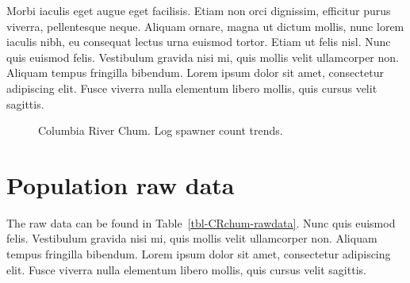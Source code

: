 \documentclass[
  letterpaper,
  oneside,
  open=any]{scrbook}
\begin{document}
Morbi iaculis eget augue eget facilisis. Etiam non orci dignissim,
efficitur purus viverra, pellentesque neque. Aliquam ornare, magna ut
dictum mollis, nunc lorem iaculis nibh, eu consequat lectus urna euismod
tortor. Etiam ut felis nisl. Nunc quis euismod felis. Vestibulum gravida
nisi mi, quis mollis velit ullamcorper non. Aliquam tempus fringilla
bibendum. Lorem ipsum dolor sit amet, consectetur adipiscing elit. Fusce
viverra nulla elementum libero mollis, quis cursus velit sagittis.

\begin{figure}


\caption{\label{fig-CRchum-status}Columbia River Chum. Log spawner count
trends.}

\end{figure}%

\section{Population raw data}\label{population-raw-data}

The raw data can be found in Table~\ref{tbl-CRchum-rawdata}. Nunc quis
euismod felis. Vestibulum gravida nisi mi, quis mollis velit ullamcorper
non. Aliquam tempus fringilla bibendum. Lorem ipsum dolor sit amet,
consectetur adipiscing elit. Fusce viverra nulla elementum libero
mollis, quis cursus velit sagittis.
\end{document}
